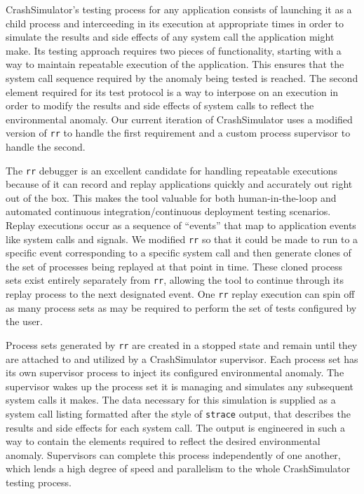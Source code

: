 CrashSimulator's testing process for any application
consists of launching it as a child process and
interceeding in its execution at appropriate times in order to simulate the
results and side effects of any system call the application might make.
Its testing approach requires two pieces of
functionality, starting with a way to maintain
repeatable execution of the application.  This ensures that
the system call sequence required by the anomaly being tested is reached.
The second element required for its test protocol is a
way to interpose on an execution in order to modify the results and side
effects of system calls to reflect the environmental
anomaly.  Our current iteration of
CrashSimulator uses a modified version of {\tt rr} to handle the first
requirement and a custom process supervisor to handle the
second.

The {\tt rr} debugger is an excellent candidate
for handling repeatable executions
because of it can
record and replay applications quickly and accurately out right out of the
box.  This makes the tool valuable for both human-in-the-loop and automated
continuous integration/continuous deployment testing scenarios.  Replay
executions occur as a sequence of ``events'' that map to application
events like system calls and signals.  We modified {\tt rr} so that it
could be made to run to a specific event corresponding to a specific system
call and then generate clones of the set of processes being replayed at that
point in time.  These cloned process sets exist entirely separately from
{\tt rr}, allowing the tool to continue through
its replay process to the next
designated event.  One {\tt rr} replay execution can spin
off as many process sets as may be required to perform the set of tests
configured by the user.

Process sets generated by {\tt rr} are created in a stopped state and
remain until they are attached to and utilized by a CrashSimulator
supervisor.  Each process set has its own supervisor process to inject
its configured environmental anomaly.  The
supervisor wakes up the process set it is managing and simulates any
subsequent system calls it makes.  The data necessary for this
simulation is
supplied as a system call listing formatted after the style of {\tt strace}
output, that describes the results and side effects for each system
call. The output is engineered in such a way to contain the
elements required to reflect the
desired environmental anomaly.  Supervisors can complete this
process independently of one another, which lends a
high degree of speed and
parallelism to the whole CrashSimulator testing process.

